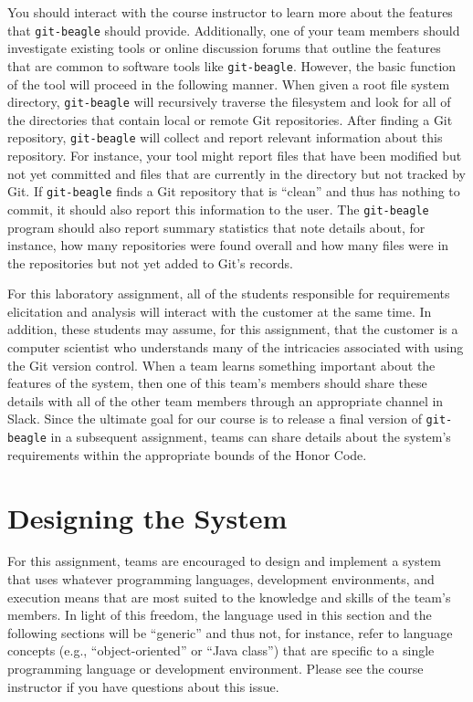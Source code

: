 You should interact with the course instructor to learn more about the features that {\tt git-beagle} should provide.
Additionally, one of your team members should investigate existing tools or online discussion forums that outline the
features that are common to software tools like {\tt git-beagle}. However, the basic function of the tool will proceed
in the following manner. When given a root file system directory, {\tt git-beagle} will recursively traverse the
filesystem and look for all of the directories that contain local or remote Git repositories. After finding a Git
repository, {\tt git-beagle} will collect and report relevant information about this repository. For instance, your tool
might report files that have been modified but not yet committed and files that are currently in the directory but
not tracked by Git. If {\tt git-beagle} finds a Git repository that is ``clean'' and thus has nothing to commit, it
should also report this information to the user. The {\tt git-beagle} program should also report summary statistics that
note details about, for instance, how many repositories were found overall and how many files were in the repositories
but not yet added to Git's records.

For this laboratory assignment, all of the students responsible for requirements elicitation and analysis will interact
with the customer at the same time. In addition, these students may assume, for this assignment, that the customer is a
computer scientist who understands many of the intricacies associated with using the Git version control. When a team
learns something important about the features of the system, then one of this team's members should share these details
with all of the other team members through an appropriate channel in Slack. Since the ultimate goal for our course is to
release a final version of {\tt git-beagle} in a subsequent assignment, teams can share details about the system's
requirements within the appropriate bounds of the Honor Code.

\section*{Designing the System}

For this assignment, teams are encouraged to design and implement a system that uses whatever programming languages,
development environments, and execution means that are most suited to the knowledge and skills of the team's members. 
In light of this freedom, the language used in this section and the following sections will be ``generic'' and thus not,
for instance, refer to language concepts (e.g., ``object-oriented'' or ``Java class'') that are specific to a single
programming language or development environment. Please see the course instructor if you have questions about this
issue.

